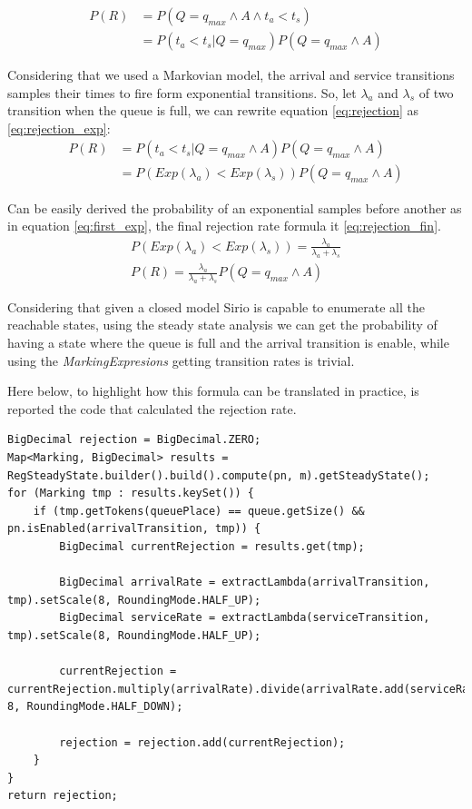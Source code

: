 \begin{equation}
    \label{eq:rejection}
    \begin{split}        
    P(R)& =P(Q=q_{max} \land A\land t_a<t_s)\\
    & = P(t_a<t_s|Q=q_{max})P(Q=q_{max} \land A)
    \end{split}
\end{equation}

Considering that we used a Markovian model, the arrival and service transitions samples their times to fire form exponential transitions. So, let $\lambda_a$ and $\lambda_s$ of two transition when the queue is full, we can rewrite equation \ref{eq:rejection} as \ref{eq:rejection_exp}:
\begin{equation}
    \label{eq:rejection_exp}
    \begin{split}
    P(R) & =  P(t_a<t_s|Q=q_{max}\land A)P(Q=q_{max}\land A) \\
     & = P(Exp(\lambda_a)<Exp(\lambda_s))P(Q=q_{max}\land A)
    \end{split}
\end{equation}

Can be easily derived the probability of an exponential samples before another as in equation \ref{eq:first_exp}, the final rejection rate formula it \ref{eq:rejection_fin}.
\begin{gather}
P(Exp(\lambda_a)<Exp(\lambda_s)) = \frac{\lambda_a}{\lambda_a + \lambda_s} \label{eq:first_exp}\\
P(R)=\frac{\lambda_a}{\lambda_a + \lambda_s}P(Q=q_{max}\land A) \label{eq:rejection_fin}
\end{gather}

Considering that given a closed model Sirio is capable to enumerate all the reachable states, using the steady state analysis we can get the probability of having a state where the queue is full and the arrival transition is enable, while using the \textit{MarkingExpresions} getting transition rates is trivial.

Here below, to highlight how this formula can be translated in practice, is reported the code that calculated the rejection rate.
\begin{lstlisting}
BigDecimal rejection = BigDecimal.ZERO;
Map<Marking, BigDecimal> results = RegSteadyState.builder().build().compute(pn, m).getSteadyState();
for (Marking tmp : results.keySet()) {
    if (tmp.getTokens(queuePlace) == queue.getSize() && pn.isEnabled(arrivalTransition, tmp)) {
        BigDecimal currentRejection = results.get(tmp);

        BigDecimal arrivalRate = extractLambda(arrivalTransition, tmp).setScale(8, RoundingMode.HALF_UP);
        BigDecimal serviceRate = extractLambda(serviceTransition, tmp).setScale(8, RoundingMode.HALF_UP);

        currentRejection = currentRejection.multiply(arrivalRate).divide(arrivalRate.add(serviceRate), 8, RoundingMode.HALF_DOWN);

        rejection = rejection.add(currentRejection);
    }
}
return rejection;
\end{lstlisting}